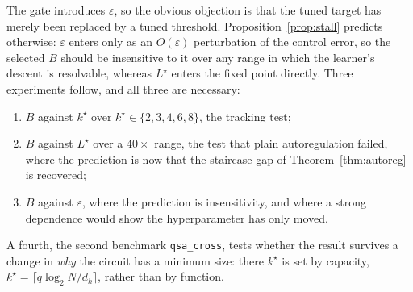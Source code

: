 \begin{remark}
\label{rem:validate}
The gate introduces $\varepsilon$, so the obvious objection is that the tuned target has
merely been replaced by a tuned threshold. Proposition~\ref{prop:stall} predicts
otherwise: $\varepsilon$ enters only as an $O(\varepsilon)$ perturbation of the control
error, so the selected $B$ should be insensitive to it over any range in which the
learner's descent is resolvable, whereas $L^\star$ enters the fixed point directly.
Three experiments follow, and all three are necessary:
\begin{enumerate}
  \item $B$ against $k^\star$ over $k^\star \in \{2,3,4,6,8\}$, the tracking test;
  \item $B$ against $L^\star$ over a $40\times$ range, the test that plain
        autoregulation failed, where the prediction is now that the staircase gap of
        Theorem~\ref{thm:autoreg} is recovered;
  \item $B$ against $\varepsilon$, where the prediction is insensitivity, and where a
        strong dependence would show the hyperparameter has only moved.
\end{enumerate}
A fourth, the second benchmark \texttt{qsa\_cross}, tests whether the result survives a
change in \emph{why} the circuit has a minimum size: there $k^\star$ is set by capacity,
$k^\star = \lceil q \log_2 N / d_k \rceil$, rather than by function.
\end{remark}
